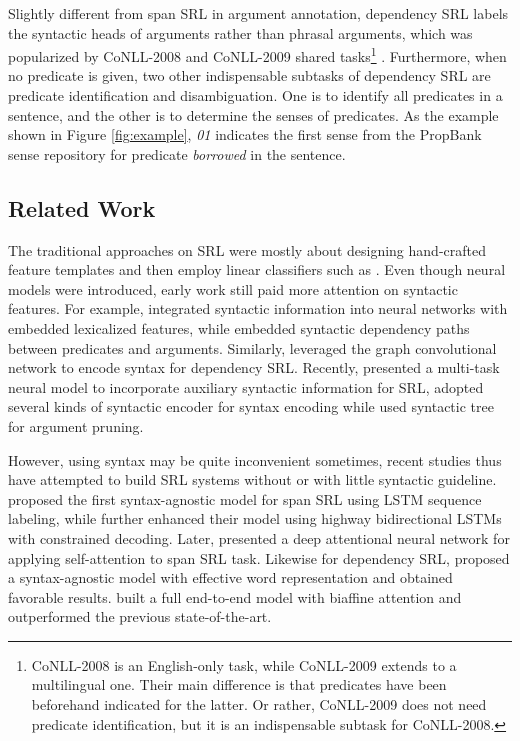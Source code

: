 \documentclass[letterpaper]{article} \usepackage{aaai19}  \usepackage{times}  \usepackage{helvet}  \usepackage{courier}  \usepackage{url}  \usepackage{graphicx}  \frenchspacing  \setlength{\pdfpagewidth}{8.5in}  \setlength{\pdfpageheight}{11in}
\begin{document}
Slightly different from span SRL in argument annotation, dependency SRL labels the syntactic heads of arguments rather than phrasal arguments, which was popularized by CoNLL-2008 and CoNLL-2009 shared tasks\footnote{CoNLL-2008 is an English-only task, while CoNLL-2009 extends to a multilingual one. Their main difference is that predicates have been beforehand indicated for the latter. Or rather, CoNLL-2009 does not need predicate identification, but it is an indispensable subtask for CoNLL-2008.} \cite{surdeanu-EtAl2008,hajivc-EtAl2009}. Furthermore, when no predicate is given, two other indispensable subtasks of dependency SRL are predicate identification and disambiguation. One is to identify all predicates in a sentence, and the other is to determine the senses of predicates. As the example shown in Figure \ref{fig:example}, \textit{01} indicates the first sense from the PropBank sense repository for predicate \textit{borrowed} in the sentence.

\subsection{Related Work}

The traditional approaches on SRL were mostly about designing hand-crafted feature templates and then employ linear classifiers such as \cite{pradhan2005,punyakanok2008importance,Zhao2009Conll}. Even though neural models were introduced, early work still paid more attention on syntactic features.
For example, \citeauthor{Fitzgerald2015}  integrated syntactic information into neural networks with embedded lexicalized features, while \citeauthor{roth2016}  embedded syntactic dependency paths between predicates and arguments. Similarly, \citeauthor{marcheggianiEMNLP2017}  leveraged the graph convolutional network to encode syntax for dependency SRL. Recently, \citeauthor{Strubell2018}  presented a multi-task neural model to incorporate auxiliary syntactic information for SRL, \citeauthor{li2018unified}  adopted several kinds of syntactic encoder for syntax encoding while \citeauthor{he:2018Syntax}  used syntactic tree for argument pruning.

However, using syntax may be quite inconvenient sometimes, recent studies thus have attempted to build SRL systems without or with little syntactic guideline. \citeauthor{zhou-xu2015}  proposed the first syntax-agnostic model for span SRL using LSTM sequence labeling,
while \citeauthor{he-acl2017}  further enhanced their model using highway bidirectional LSTMs with constrained decoding. Later, \citeauthor{selfatt2018}  presented a deep attentional neural network for applying self-attention to span SRL task. Likewise for dependency SRL, \citeauthor{marcheggiani2017}  proposed a syntax-agnostic model with effective word representation and obtained favorable results. \citeauthor{cai2018full}  built a full end-to-end model with biaffine attention and outperformed the previous state-of-the-art.
\end{document}
